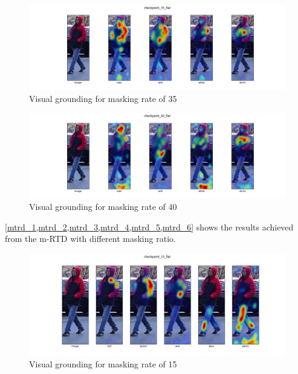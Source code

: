\begin{figure}[htbp]
  \includegraphics[width=\linewidth]{img/mlm2/mlm-checkpoint_35_flat.png}
  \caption{Visual grounding for masking rate of 35}
  \label{fig:mlm_5}
\end{figure}

\begin{figure}[htbp]
  \includegraphics[width=\linewidth]{img/mlm2/mlm-checkpoint_40_flat.png}
  \caption{Visual grounding for masking rate of 40}
  \label{fig:mlm_6}
\end{figure}



\ref{mtrd_1,mtrd_2,mtrd_3,mtrd_4,mtrd_5,mtrd_6} shows the results achieved from the m-RTD with different masking ratio.


\begin{figure}[htbp]
  \includegraphics[width=\linewidth]{img/mrtd_masking_ratio/mrtd-checkpoint_15_flat.png}
  \caption{Visual grounding for masking rate of 15}
  \label{fig:mtrd_1}
\end{figure}

